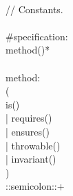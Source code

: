\begin{bigbigpre}
 \\
// Constants. \\
 \\
#specification: \\
    method()* \\
 \\
method: \\
    ( \\
        is() \\
      | requires() \\
      | ensures() \\
      | throwable() \\
      | invariant() \\
    ) \\
    ::semicolon::+ \\

\end{bigbigpre}
